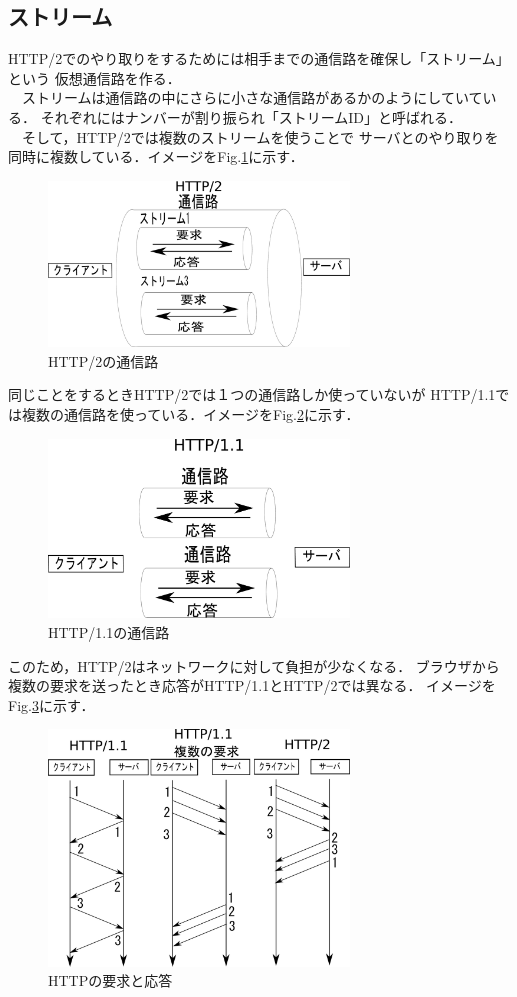 \documentclass[a4j,9pt,twocolumn]{jsarticle}
\begin{document}
\subsection{ストリーム}
HTTP/2でのやり取りをするためには相手までの通信路を確保し「ストリーム」という
仮想通信路を作る．
\\　ストリームは通信路の中にさらに小さな通信路があるかのようにしていている．
それぞれにはナンバーが割り振られ「ストリームID」と呼ばれる．
\\　そして，HTTP/2では複数のストリームを使うことで
サーバとのやり取りを同時に複数している．イメージをFig.\ref{figHTTP200}に示す．

\begin{figure}[h]
\centering
\includegraphics[width=80mm]{img/TCPco6.eps}
\caption{HTTP/2の通信路}
\label{figHTTP200}
\end{figure}

同じことをするときHTTP/2では１つの通信路しか使っていないが
HTTP/1.1では複数の通信路を使っている．イメージをFig.\ref{figHTTP1.1}に示す．


\begin{figure}[h]
\centering
\includegraphics[width=80mm]{img/TCPco5.eps}
\caption{HTTP/1.1の通信路}
\label{figHTTP1.1}
\end{figure}

このため，HTTP/2はネットワークに対して負担が少なくなる．
ブラウザから複数の要求を送ったとき応答がHTTP/1.1とHTTP/2では異なる．
イメージをFig.\ref{HTTPrespons}に示す．


\begin{figure}[h]
\centering
\includegraphics[width=80mm]{img/RR3.eps}
\caption{HTTPの要求と応答}
\label{HTTPrespons}
\end{figure}
\end{document}
